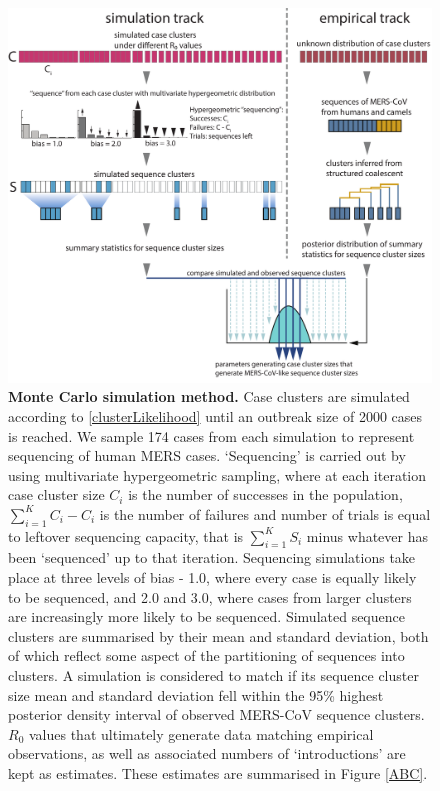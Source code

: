 \documentclass[11pt,oneside,letterpaper]{article}
\def\gdc#1{\textcolor{blue}{[#1]}}
\def\lmc#1{\textcolor{green}{[#1]}}
\begin{document}
\begin{figure}[h]
\centering
	\includegraphics[scale=0.25]{figures/mers_method.pdf}
	\caption{\textbf{Monte Carlo simulation method.}
Case clusters are simulated according to \ref{clusterLikelihood} until an outbreak size of 2000 cases is reached.
We sample 174 cases from each simulation to represent sequencing of human MERS cases.%
`Sequencing' is carried out by using multivariate hypergeometric sampling, where at each iteration case cluster size $C_{i}$ is the number of successes in the population, $\sum_{i=1}^{K} C_{i} - C_{i}$ is the number of failures and number of trials is equal to leftover sequencing capacity, that is $\sum_{i=1}^{K} S_{i}$ minus whatever has been `sequenced' up to that iteration.
Sequencing simulations take place at three levels of bias - 1.0, where every case is equally likely to be sequenced, and 2.0 and 3.0, where cases from larger clusters are increasingly more likely to be sequenced.
Simulated sequence clusters are summarised by their mean and standard deviation, both of which reflect some aspect of the partitioning of sequences into clusters.
A simulation is considered to match if its sequence cluster size mean and standard deviation fell within the 95\% highest posterior density interval of observed MERS-CoV sequence clusters.
$R_{0}$ values that ultimately generate data matching empirical observations, as well as associated numbers of `introductions' are kept as estimates.
These estimates are summarised in Figure \ref{ABC}.
	}
	\label{method}
\end{figure}
\end{document}
